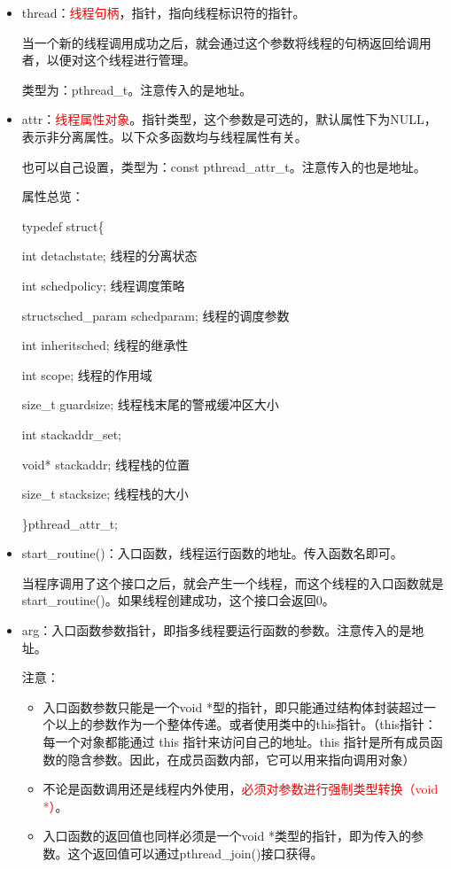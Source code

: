 \documentclass[UTF8]{article}%
\begin{document}
\begin{itemize}
    \item thread：\textcolor{red}{线程句柄}，指针，指向线程标识符的指针。 
    
    当一个新的线程调用成功之后，就会通过这个参数将线程的句柄返回给调用者，以便对这个线程进行管理。 

    类型为：pthread\_t。注意传入的是地址。

    \item attr：\textcolor{red}{线程属性对象}。指针类型，这个参数是可选的，默认属性下为NULL，表示非分离属性。以下众多函数均与线程属性有关。
    
    也可以自己设置，类型为：const pthread\_attr\_t。注意传入的也是地址。

    属性总览：

    typedef struct\{

    \qquad int \qquad detachstate;   线程的分离状态

    \qquad int \qquad schedpolicy;  线程调度策略

    \qquad structsched\_param \qquad schedparam;  线程的调度参数

    \qquad int \qquad inheritsched;  线程的继承性

    \qquad int \qquad scope;       线程的作用域

    \qquad size\_t \qquad guardsize;   线程栈末尾的警戒缓冲区大小

    \qquad int \qquad stackaddr\_set;

    \qquad void* \qquad stackaddr;   线程栈的位置

    \qquad size\_t \qquad stacksize;    线程栈的大小

    \}pthread\_attr\_t;

    \item start\_routine()：入口函数，线程运行函数的地址。传入函数名即可。
    
    当程序调用了这个接口之后，就会产生一个线程，而这个线程的入口函数就是start\_routine()。如果线程创建成功，这个接口会返回0。 

    \item arg：入口函数参数指针，即指多线程要运行函数的参数。注意传入的是地址。
    
    注意：
    
    {
        \begin{itemize}
            \item 入口函数参数只能是一个void *型的指针，即只能通过结构体封装超过一个以上的参数作为一个整体传递。或者使用类中的this指针。（this指针：每一个对象都能通过 this 指针来访问自己的地址。this 指针是所有成员函数的隐含参数。因此，在成员函数内部，它可以用来指向调用对象）
            \item 不论是函数调用还是线程内外使用，\textcolor{red}{必须对参数进行强制类型转换（void *）}。
            \item 入口函数的返回值也同样必须是一个void *类型的指针，即为传入的参数。这个返回值可以通过pthread\_join()接口获得。
        \end{itemize}
    }
    
\end{itemize}
\end{document}
